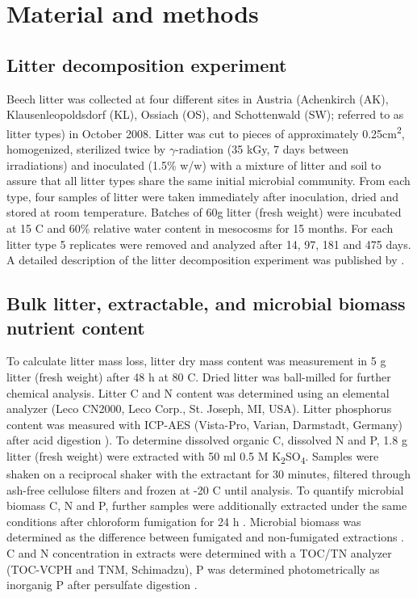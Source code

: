 \section*{Material and methods}
\subsection*{Litter decomposition experiment}
Beech litter was collected at four different sites in Austria (Achenkirch (AK), Klausenleopoldsdorf (KL), Ossiach (OS), and Schottenwald (SW); referred to as litter types) in October 2008. Litter was cut to pieces of approximately 0.25cm\textsuperscript{2}, homogenized, sterilized twice by $\gamma$-radiation (35 kGy, 7 days between irradiations) and inoculated (1.5\% w/w) with a mixture of litter and soil to assure that all litter types share the same initial microbial community. From each type, four samples of litter were taken immediately after inoculation, dried and stored at room temperature. Batches of 60g litter (fresh weight) were incubated at 15 \textdegree C and 60\% relative water content in mesocosms for 15 months. For each litter type 5 replicates were removed and analyzed after 14, 97, 181 and 475 days. A detailed description of the litter decomposition experiment was published by \cite{Wanek2010}.

\subsection*{Bulk litter, extractable, and microbial biomass nutrient content}
To calculate litter mass loss, litter dry mass content was measurement in 5 g litter (fresh weight) after 48 h at 80  \textdegree C. Dried litter was ball-milled for further chemical analysis. Litter C and N content was determined using an elemental analyzer (Leco CN2000, Leco Corp., St. Joseph, MI, USA). Litter phosphorus content was measured with ICP-AES (Vista-Pro, Varian, Darmstadt, Germany) after acid digestion \cite{Kolmer}).
To determine dissolved organic C, dissolved N and P, 1.8 g litter (fresh weight) were extracted with 50 ml 0.5 M K\textsubscript{2}SO\textsubscript{4}. Samples were shaken on a reciprocal shaker with the extractant for 30 minutes, filtered through ash-free cellulose filters and frozen at -20 \textdegree C until analysis. To quantify microbial biomass C, N and P, further samples were additionally extracted under the same conditions after chloroform fumigation for 24 h  \cite{Brooks1985}. Microbial biomass was determined as the difference between fumigated and non-fumigated extractions . C and N concentration in extracts were determined with a TOC/TN analyzer (TOC-VCPH and TNM, Schimadzu), P was determined photometrically as inorganig P after persulfate digestion \cite{Schinner1996}.

